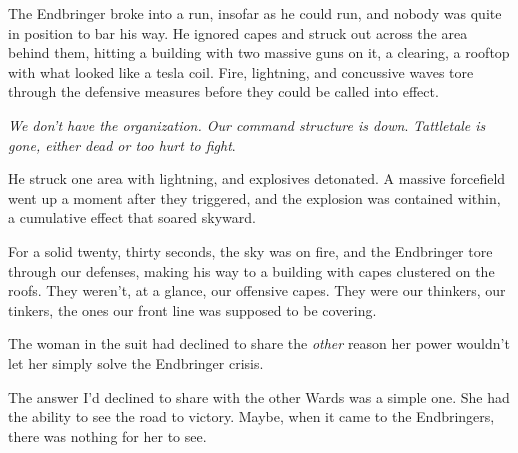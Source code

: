 The Endbringer broke into a run, insofar as he could run, and nobody was quite in position to bar his way.  He ignored capes and struck out across the area behind them, hitting a building with two massive guns on it, a clearing, a rooftop with what looked like a tesla coil.  Fire, lightning, and concussive waves tore through the defensive measures before they could be called into effect.



\emph{We don't have the organization.  Our command structure is down}.  \emph{Tattletale is gone, either dead or too hurt to fight}.



He struck one area with lightning, and explosives detonated.  A massive forcefield went up a moment after they triggered, and the explosion was contained within, a cumulative effect that soared skyward.



For a solid twenty, thirty seconds, the sky was on fire, and the Endbringer tore through our defenses, making his way to a building with capes clustered on the roofs.  They weren't, at a glance, our offensive capes.  They were our thinkers, our tinkers, the ones our front line was supposed to be covering.



The woman in the suit had declined to share the \emph{other }reason her power wouldn't let her simply solve the Endbringer crisis.



The answer I'd declined to share with the other Wards was a simple one.  She had the ability to see the road to victory.  Maybe, when it came to the Endbringers, there was nothing for her to see.





